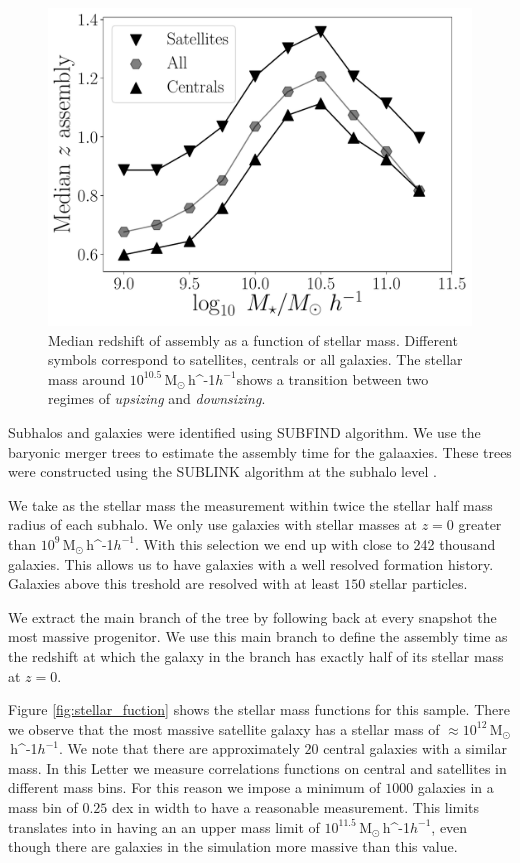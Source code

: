\documentclass[fleqn,usenatbib]{mnras}
\newcommand{\Msunh}{\,{\rm M}$_{\odot}$\,\ifmmode h^{-1}\else $h^{-1}$\fi}
\begin{document}
\begin{figure}
    \centering
    \includegraphics[width=1\columnwidth]{figuras/median_assembly.pdf}
    \caption{Median redshift of assembly as a function of stellar mass.
    Different symbols correspond to satellites, centrals or all galaxies.
    The stellar mass around $10^{10.5}$\Msunh shows a transition between two 
    regimes of \emph{upsizing} and \emph{downsizing}.}
    \label{fig:median_assembly}
\end{figure}


Subhalos and galaxies were identified using SUBFIND algorithm.
We use the baryonic merger trees to estimate the assembly time for the
galaaxies.
These trees were constructed using the SUBLINK algorithm at the
subhalo level \citep{2015MNRAS.449...49R}.

We take as the stellar mass the measurement within
twice the stellar half mass radius of each subhalo.
We only use galaxies with stellar masses at $z=0$ greater than
$10^{9}$\Msunh.
With this selection we end up with close to 242 thousand galaxies.
This allows us to have galaxies with a well resolved formation
history. 
Galaxies above this treshold are resolved with at least $150$ stellar
particles. 

We extract the main branch of the tree by following back at every
snapshot the most massive progenitor.
We use this main branch to define the assembly time as the redshift
at which the galaxy in the branch has exactly half of its stellar mass
at $z=0$.   


Figure \ref{fig:stellar_fuction} shows the stellar mass functions for
this sample.
There we observe that the most massive satellite galaxy has a stellar
mass of $\approx 10^{12}$\Msunh.    
We note that there are approximately $20$ central galaxies
with a similar mass.
In this Letter we measure correlations functions on central and
satellites in different mass bins.
For this reason we impose a  minimum of $1000$ galaxies
in a mass bin of $0.25$ dex in width to have a reasonable
measurement. 
This limits translates into in having an an upper mass limit of
$10^{11.5}$\Msunh, even though there are galaxies in the simulation
more massive than this value.
\end{document}
